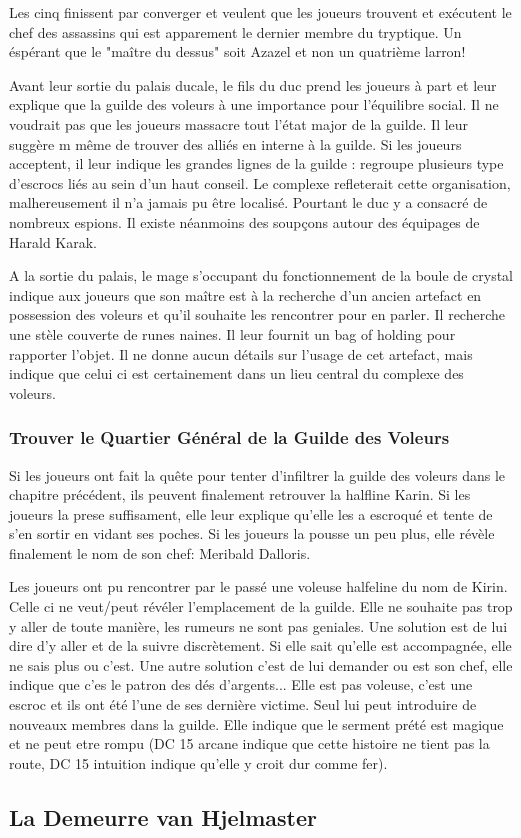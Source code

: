 Les cinq finissent par converger et veulent que les joueurs trouvent et exécutent 
le chef des assassins qui est apparement le dernier membre du tryptique. Un éspérant
que le "maître du dessus" soit Azazel et non un quatrième larron!

Avant leur sortie du palais ducale, le fils du duc prend les joueurs à part et leur 
explique que la guilde des voleurs à une importance pour l'équilibre social. Il ne 
voudrait pas que les joueurs massacre tout l'état major de la guilde. Il leur suggère m
même de trouver des alliés en interne à la guilde. Si les joueurs acceptent, il leur 
indique les grandes lignes de la guilde : regroupe plusieurs type d'escrocs liés au 
sein d'un haut conseil. Le complexe refleterait cette organisation, malhereusement
il n'a jamais pu être localisé. Pourtant le duc y a consacré de nombreux espions.
Il existe néanmoins des soupçons autour des équipages de Harald Karak.

A la sortie du palais, le mage s'occupant du fonctionnement de la boule de crystal
indique aux joueurs que son maître est à la recherche d'un ancien artefact en 
possession des voleurs et qu'il souhaite les rencontrer pour en parler. Il recherche
une stèle couverte de runes naines. Il leur fournit un bag of holding pour rapporter 
l'objet. Il ne donne aucun détails sur l'usage de cet artefact, mais indique que 
celui ci est certainement dans un lieu central du complexe des voleurs.

\subsubsection{Trouver le Quartier Général de la Guilde des Voleurs}

Si les joueurs ont fait la quête pour tenter d'infiltrer la guilde des voleurs 
dans le chapitre précédent, ils peuvent finalement retrouver la halfline Karin.
Si les joueurs la prese suffisament, elle leur explique qu'elle les a escroqué
et tente de s'en sortir en vidant ses poches. Si les joueurs la pousse un peu
plus, elle révèle finalement le nom de son chef: Meribald Dalloris.

Les joueurs ont pu rencontrer par le passé une voleuse halfeline du nom de
Kirin. Celle ci ne veut/peut révéler l'emplacement de la guilde. Elle ne souhaite
pas trop y aller de toute manière, les rumeurs ne sont pas geniales. Une solution
est de lui dire d'y aller et de la suivre discrètement. Si elle sait qu'elle est 
accompagnée, elle ne sais plus ou c'est. Une autre solution c'est de lui demander 
ou est son chef, elle indique que c'es le patron des dés d'argents... Elle est
pas voleuse, c'est une escroc et ils ont été l'une de ses dernière victime. Seul
lui peut introduire de nouveaux membres dans la guilde. Elle indique que 
le serment prété est magique et ne peut etre rompu (DC 15 arcane indique que
cette histoire ne tient pas la route, DC 15 intuition indique qu'elle y croit dur 
comme fer).

\subsection*{La Demeurre van Hjelmaster}

